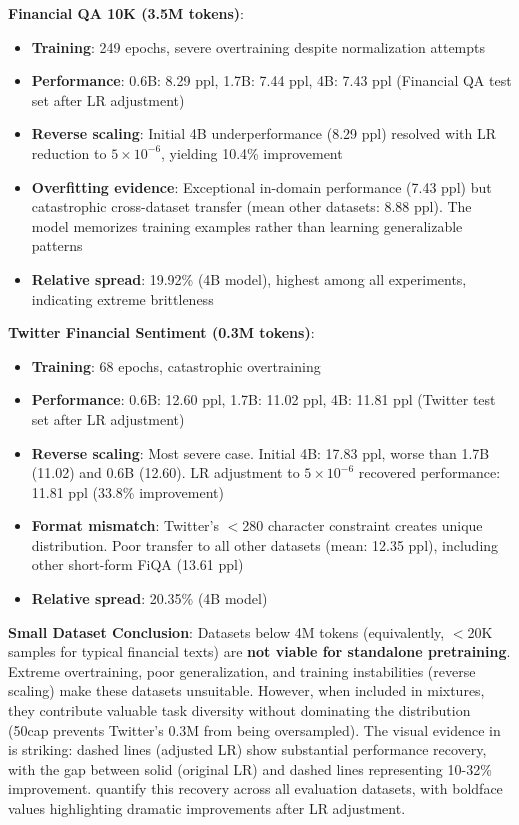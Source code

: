 \textbf{Financial QA 10K (3.5M tokens)}:
\begin{itemize}
\item \textbf{Training}: 249 epochs, severe overtraining despite normalization attempts
\item \textbf{Performance}: 0.6B: 8.29 ppl, 1.7B: 7.44 ppl, 4B: 7.43 ppl (Financial QA test set after LR adjustment)
\item \textbf{Reverse scaling}: Initial 4B underperformance (8.29 ppl) resolved with LR reduction to $5 \times 10^{-6}$, yielding 10.4\% improvement
\item \textbf{Overfitting evidence}: Exceptional in-domain performance (7.43 ppl) but catastrophic cross-dataset transfer (mean other datasets: 8.88 ppl). The model memorizes training examples rather than learning generalizable patterns
\item \textbf{Relative spread}: 19.92\% (4B model), highest among all experiments, indicating extreme brittleness
\end{itemize}

\textbf{Twitter Financial Sentiment (0.3M tokens)}:
\begin{itemize}
\item \textbf{Training}: 68 epochs, catastrophic overtraining
\item \textbf{Performance}: 0.6B: 12.60 ppl, 1.7B: 11.02 ppl, 4B: 11.81 ppl (Twitter test set after LR adjustment)
\item \textbf{Reverse scaling}: Most severe case. Initial 4B: 17.83 ppl, worse than 1.7B (11.02) and 0.6B (12.60). LR adjustment to $5 \times 10^{-6}$ recovered performance: 11.81 ppl (33.8\% improvement)
\item \textbf{Format mismatch}: Twitter's $<$280 character constraint creates unique distribution. Poor transfer to all other datasets (mean: 12.35 ppl), including other short-form FiQA (13.61 ppl)
\item \textbf{Relative spread}: 20.35\% (4B model)
\end{itemize}

\textbf{Small Dataset Conclusion}: Datasets below 4M tokens (equivalently, $<$20K samples for typical financial texts) are \textbf{not viable for standalone pretraining}. Extreme overtraining, poor generalization, and training instabilities (reverse scaling) make these datasets unsuitable. However, when included in mixtures, they contribute valuable task diversity without dominating the distribution (50cap prevents Twitter's 0.3M from being oversampled). The visual evidence in  is striking: dashed lines (adjusted LR) show substantial performance recovery, with the gap between solid (original LR) and dashed lines representing 10-32\% improvement.  quantify this recovery across all evaluation datasets, with boldface values highlighting dramatic improvements after LR adjustment.

